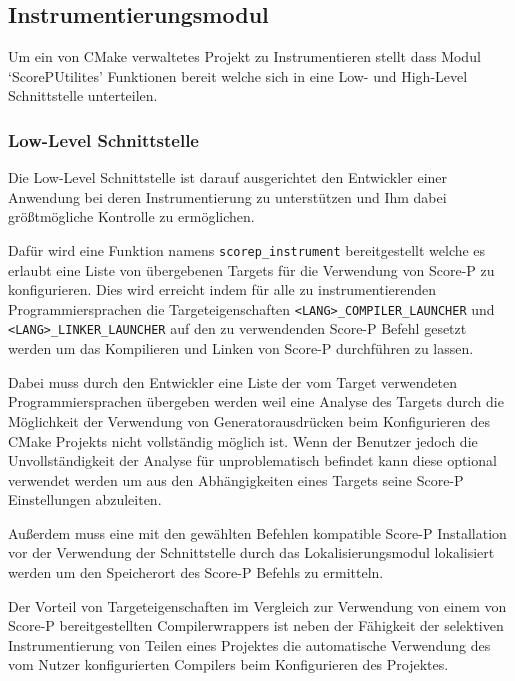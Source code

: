 \documentclass[german,proseminar,hyperref,utf8,lof]{zihpub}
\begin{document}
    \subsection{Instrumentierungsmodul}
    Um ein von CMake verwaltetes Projekt zu Instrumentieren stellt dass Modul `ScorePUtilites'
    Funktionen bereit welche sich in eine Low- und High-Level Schnittstelle unterteilen.

    \subsubsection{Low-Level Schnittstelle}
    Die Low-Level Schnittstelle ist darauf ausgerichtet den Entwickler einer Anwendung bei deren
    Instrumentierung zu unterstützen und Ihm dabei grö{\ss}tmögliche Kontrolle zu ermöglichen.

    Dafür wird eine Funktion namens \texttt{scorep\_instrument} bereitgestellt welche es erlaubt eine Liste
    von übergebenen Targets für die Verwendung von Score-P zu konfigurieren.
    Dies wird erreicht indem für alle zu instrumentierenden Programmiersprachen die Targeteigenschaften
    \texttt{<LANG>\_COMPILER\_LAUNCHER} und \texttt{<LANG>\_LINKER\_LAUNCHER} auf den zu verwendenden
    Score-P Befehl gesetzt werden um das Kompilieren und Linken von Score-P durchführen zu lassen.

    Dabei muss durch den Entwickler eine Liste der vom Target verwendeten Programmiersprachen übergeben
    werden weil eine Analyse des Targets durch die Möglichkeit der Verwendung von Generatorausdrücken 
    beim Konfigurieren des CMake Projekts nicht vollständig möglich ist.
    Wenn der Benutzer jedoch die Unvollständigkeit der Analyse für unproblematisch befindet
    kann diese optional verwendet werden um aus den Abhängigkeiten eines Targets seine Score-P
    Einstellungen abzuleiten.

    Au{\ss}erdem muss eine mit den gewählten Befehlen kompatible Score-P Installation vor der Verwendung
    der Schnittstelle durch das Lokalisierungsmodul lokalisiert werden um den Speicherort des
    Score-P Befehls zu ermitteln.

    Der Vorteil von Targeteigenschaften im Vergleich zur Verwendung von einem von Score-P bereitgestellten
    Compilerwrappers ist neben der Fähigkeit der selektiven Instrumentierung von Teilen eines Projektes
    die automatische Verwendung des vom Nutzer konfigurierten Compilers beim Konfigurieren des Projektes.
\end{document}
